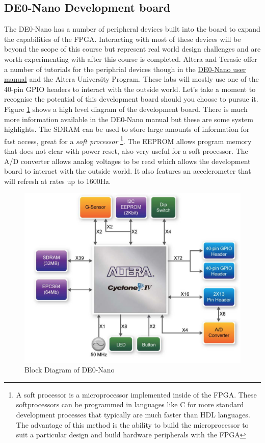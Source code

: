     \subsection{DE0-Nano Development board}
      The DE0-Nano has a number of peripheral devices built into the board to expand the capabilities of the FPGA. Interacting with most of these devices will be beyond the scope of this course but represent real world design challenges and are worth experimenting with after this course is completed. Altera and Terasic offer a number of tutorials for the periphrial devices though in the \href{http://www.terasic.com.tw/cgi-bin/page/archive_download.pl?Language=English&No=593&FID=75023fa36c9bf8639384f942e65a46f3}{DE0-Nano user manual} and the Altera University Program. These labs will mostly use one of the 40-pin GPIO headers to interact with the outside world. Let's take a moment to recognise the potential of this development board should you choose to pursue it. Figure \ref{DEOBlockDia} shows a high level diagram of the development board. There is much more information available in the DE0-Nano manual but these are some system highlights. The SDRAM can be used to store large amounts of information for fast access, great for a {\it soft processor} \footnote{A soft processor is a microprocessor implemented inside of the FPGA. These softprocessors can be programmed in languages like C for more standard development processes that typically are much faster than HDL languages. The advantage of this method is the ability to build the microprocessor to suit a particular design and build hardware peripherals with the FPGA}. The EEPROM allows program memory that does not clear with power reset, also very useful for a soft processor. The A/D converter allows analog voltages to be read which allows the development board to interact with the outside world. It also features an accelerometer that will refresh at rates up to 1600Hz.      
      \begin{figure}[htpb]
        \includegraphics[width=.48\textwidth]{Images/DEONanoBlockDiagram.png}
        \caption{Block Diagram of DE0-Nano \cite{DE0Manual}}
        \label{DEOBlockDia}
      \end{figure}
